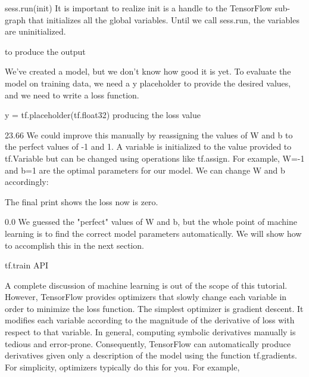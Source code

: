 \documentclass[10pt,a4paper]{ctexbook}
\begin{document}
sess.run(init)
It is important to realize init is a handle to the TensorFlow sub-graph that initializes all the global variables. Until we call sess.run, the variables are uninitialized.


to produce the output

We've created a model, but we don't know how good it is yet. To evaluate the model on training data, we need a y placeholder to provide the desired values, and we need to write a loss function.


y = tf.placeholder(tf.float32)
producing the loss value

23.66
We could improve this manually by reassigning the values of W and b to the perfect values of -1 and 1. A variable is initialized to the value provided to tf.Variable but can be changed using operations like tf.assign. For example, W=-1 and b=1 are the optimal parameters for our model. We can change W and b accordingly:

The final print shows the loss now is zero.

0.0
We guessed the "perfect" values of W and b, but the whole point of machine learning is to find the correct model parameters automatically. We will show how to accomplish this in the next section.

tf.train API

A complete discussion of machine learning is out of the scope of this tutorial. However, TensorFlow provides optimizers that slowly change each variable in order to minimize the loss function. The simplest optimizer is gradient descent. It modifies each variable according to the magnitude of the derivative of loss with respect to that variable. In general, computing symbolic derivatives manually is tedious and error-prone. Consequently, TensorFlow can automatically produce derivatives given only a description of the model using the function tf.gradients. For simplicity, optimizers typically do this for you. For example,
\end{document}

